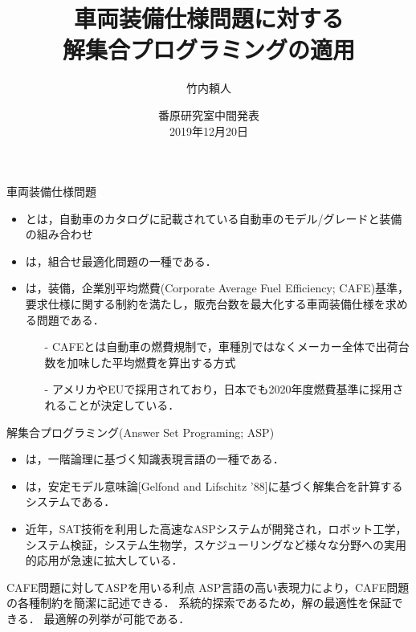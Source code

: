 \documentclass[dvipdfmx, 11pt]{beamer}
\title{車両装備仕様問題に対する\\解集合プログラミングの適用}
\author{竹内頼人}
\institute{名古屋大学 工学部 電気電子・情報工学科 情報工学コース 4年}
\date{番原研究室中間発表\\2019年12月20日}
\begin{document}
\begin{frame} {}
 \titlepage
\end{frame}
\begin{frame}{車両装備仕様問題}
 \begin{itemize}
 \setlength{\itemsep}{10pt}
  \item {}とは，自動車のカタログに記載されている自動車のモデル/グレードと装備の組み合わせ
 
  \item {}は，組合せ最適化問題の一種である．

   \item {}は，装備，企業別平均燃費(Corporate Average Fuel Efficiency; CAFE)基準，
      要求仕様に関する制約を満たし，販売台数を最大化する車両装備仕様を求める問題である．
    \begin{itemize}
    \setlength{\itemsep}{7pt}
     \item[-] CAFEとは自動車の燃費規制で，車種別ではなくメーカー全体で出荷台数を加味した平均燃費を算出する方式
      \item[-] アメリカやEUで採用されており，日本でも2020年度燃費基準に採用されることが決定している．
     \end{itemize}
 \end{itemize}
\end{frame}
\begin{frame}{解集合プログラミング(Answer Set Programing; ASP)}
 \begin{itemize}
   \setlength{\itemsep}{10pt}
   \item {}は，一階論理に基づく知識表現言語の一種である．
   \item {}は，安定モデル意味論[Gelfond and Lifschitz '88]に基づく解集合を計算するシステムである．
   \item 近年，SAT技術を利用した高速なASPシステムが開発され，ロボット工学，システム検証，システム生物学，スケジューリングなど様々な分野への実用的応用が急速に拡大している．
 \end{itemize}
  \begin{exampleblock}{CAFE問題に対してASPを用いる利点}
 	ASP言語の高い表現力により，CAFE問題の各種制約を簡潔に記述できる．
      	系統的探索であるため，解の最適性を保証できる．
      	最適解の列挙が可能である．
 \end{exampleblock}

\end{frame}
\end{document}

